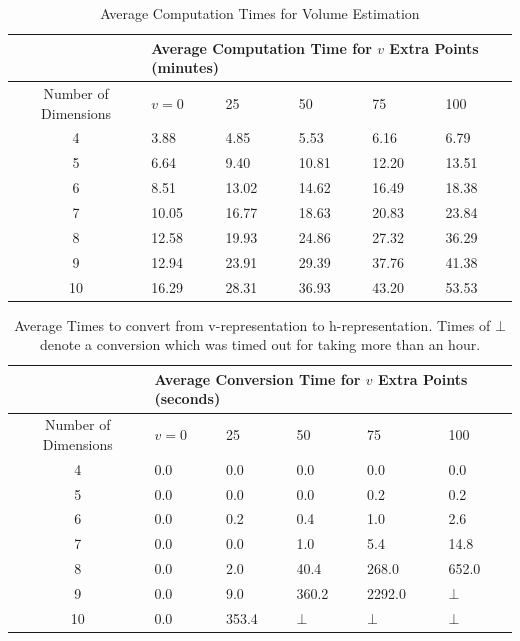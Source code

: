 \begin{table}[h]
\centering
\begin{tabular}{| c || p{1cm} | p{1cm} | p{1cm} | p{1cm} | p{1cm}|}
\hline
&\multicolumn{5}{p{6cm}|}{Average Computation Time for $v$ Extra Points (minutes)} \\
\hline
Number of Dimensions & $v = 0$ & 25 & 50 & 75 & 100\\
\hline
4  & 3.88  & 4.85  & 5.53  & 6.16  & 6.79  \\
5  & 6.64  & 9.40  & 10.81 & 12.20 & 13.51 \\
6  & 8.51  & 13.02 & 14.62 & 16.49 & 18.38 \\
7  & 10.05 & 16.77 & 18.63 & 20.83 & 23.84 \\
8  & 12.58 & 19.93 & 24.86 & 27.32 & 36.29 \\
9  & 12.94 & 23.91 & 29.39 & 37.76 & 41.38 \\
10 & 16.29 & 28.31 & 36.93 & 43.20 & 53.53 \\
\hline
\end{tabular}
\caption{Average Computation Times for Volume Estimation}
\label{tab_estimation_time}
\end{table}


\begin{table}[h]
\centering
\begin{tabular}{| c || p{1cm} | p{1cm} | p{1cm} | p{1cm} | p{1cm}|}
\hline
&\multicolumn{5}{p{6cm}|}{Average Conversion Time for $v$ Extra Points (seconds)} \\
\hline
Number of Dimensions & $v = 0$ & 25 & 50 & 75 & 100\\
\hline
4 & 0.0 & 0.0   & 0.0    & 0.0    & 0.0 \\
5 & 0.0 & 0.0   & 0.0    & 0.2    & 0.2 \\
6 & 0.0 & 0.2   & 0.4    & 1.0    & 2.6 \\
7 & 0.0 & 0.0   & 1.0    & 5.4    & 14.8 \\
8 & 0.0 & 2.0   & 40.4   & 268.0  & 652.0 \\
9 & 0.0 & 9.0   & 360.2  & 2292.0 & $\bot$ \\
10& 0.0 & 353.4 & $\bot$ & $\bot$ & $\bot$ \\
\hline
\end{tabular}
\caption{Average Times to convert from v-representation to h-representation. Times of $\bot$ denote a conversion which was timed out for taking more than an hour.}
\label{tab_conversion_time}
\end{table}

